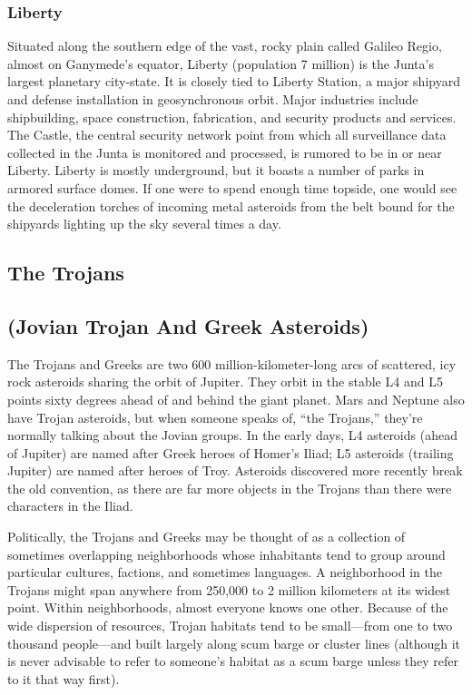 \subsubsection{Liberty}

Situated along the southern edge of the vast, rocky 
plain called Galileo Regio, almost on Ganymede's 
equator, Liberty (population 7 million) is the Junta's 
largest planetary city-state. It is closely tied to Liberty 
Station, a major shipyard and defense installation in 
geosynchronous orbit. Major industries include shipbuilding, space construction, fabrication, and security 
products and services. The Castle, the central security 
network point from which all surveillance data collected in the Junta is monitored and processed, is 
rumored to be in or near Liberty. Liberty is mostly 
underground, but it boasts a number of parks in armored surface domes. If one were to spend enough 
time topside, one would see the deceleration torches 
of incoming metal asteroids from the belt bound for 
the shipyards lighting up the sky several times a day.

\subsection{The Trojans}


\subsection{(Jovian Trojan And Greek Asteroids)}

The Trojans and Greeks are two 600 million-kilometer-long arcs of scattered, icy rock asteroids sharing 
the orbit of Jupiter. They orbit in the stable L4 and 
L5 points sixty degrees ahead of and behind the giant 
planet. Mars and Neptune also have Trojan asteroids, 
but when someone speaks of, ``the Trojans,'' they're 
normally talking about the Jovian groups. In the early 
days, L4 asteroids (ahead of Jupiter) are named after 
Greek heroes of Homer's Iliad; L5 asteroids (trailing 
Jupiter) are named after heroes of Troy. Asteroids 
discovered more recently break the old convention, as 
there are far more objects in the Trojans than there 
were characters in the Iliad.

Politically, the Trojans and Greeks may be thought 
of as a collection of sometimes overlapping neighborhoods whose inhabitants tend to group around particular cultures, factions, and sometimes languages. 
A neighborhood in the Trojans might span anywhere 
from 250,000 to 2 million kilometers at its widest 
point. Within neighborhoods, almost everyone knows 
one other. Because of the wide dispersion of resources, 
Trojan habitats tend to be small—from one to two 
thousand people—and built largely along scum barge 
or cluster lines (although it is never advisable to refer 
to someone's habitat as a scum barge unless they refer 
to it that way first).

